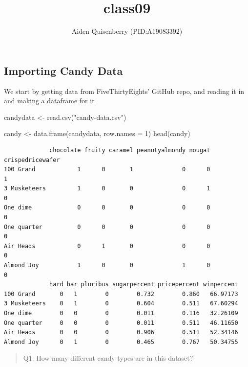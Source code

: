 \documentclass[
  letterpaper,
  DIV=11,
  numbers=noendperiod]{scrartcl}
\title{class09}
\author{Aiden Quisenberry (PID:A19083392)}
\date{}
\newenvironment{Shaded}{\begin{snugshade}}{\end{snugshade}}
\newcommand{\AttributeTok}[1]{\textcolor[rgb]{0.40,0.45,0.13}{#1}}
\newcommand{\DecValTok}[1]{\textcolor[rgb]{0.68,0.00,0.00}{#1}}
\newcommand{\FunctionTok}[1]{\textcolor[rgb]{0.28,0.35,0.67}{#1}}
\newcommand{\NormalTok}[1]{\textcolor[rgb]{0.00,0.23,0.31}{#1}}
\newcommand{\OtherTok}[1]{\textcolor[rgb]{0.00,0.23,0.31}{#1}}
\newcommand{\StringTok}[1]{\textcolor[rgb]{0.13,0.47,0.30}{#1}}
\renewcommand*\contentsname{Table of contents}
\newcommand\contentsname{Table of contents}
\begin{document}
\maketitle

\renewcommand*\contentsname{Table of contents}
{
\hypersetup{linkcolor=}
\setcounter{tocdepth}{3}
\tableofcontents
}

\subsection{Importing Candy Data}\label{importing-candy-data}

We start by getting data from FiveThirtyEights' GitHub repo, and reading
it in and making a dataframe for it

\begin{Shaded}
\begin{Highlighting}[]
\NormalTok{candydata }\OtherTok{\textless{}{-}} \FunctionTok{read.csv}\NormalTok{(}\StringTok{"candy{-}data.csv"}\NormalTok{)}

\NormalTok{candy }\OtherTok{\textless{}{-}}  \FunctionTok{data.frame}\NormalTok{(candydata, }\AttributeTok{row.names =} \DecValTok{1}\NormalTok{)}
\FunctionTok{head}\NormalTok{(candy)}
\end{Highlighting}
\end{Shaded}

\begin{verbatim}
             chocolate fruity caramel peanutyalmondy nougat crispedricewafer
100 Grand            1      0       1              0      0                1
3 Musketeers         1      0       0              0      1                0
One dime             0      0       0              0      0                0
One quarter          0      0       0              0      0                0
Air Heads            0      1       0              0      0                0
Almond Joy           1      0       0              1      0                0
             hard bar pluribus sugarpercent pricepercent winpercent
100 Grand       0   1        0        0.732        0.860   66.97173
3 Musketeers    0   1        0        0.604        0.511   67.60294
One dime        0   0        0        0.011        0.116   32.26109
One quarter     0   0        0        0.011        0.511   46.11650
Air Heads       0   0        0        0.906        0.511   52.34146
Almond Joy      0   1        0        0.465        0.767   50.34755
\end{verbatim}

\begin{quote}
Q1. How many different candy types are in this dataset?
\end{quote}
\end{document}
